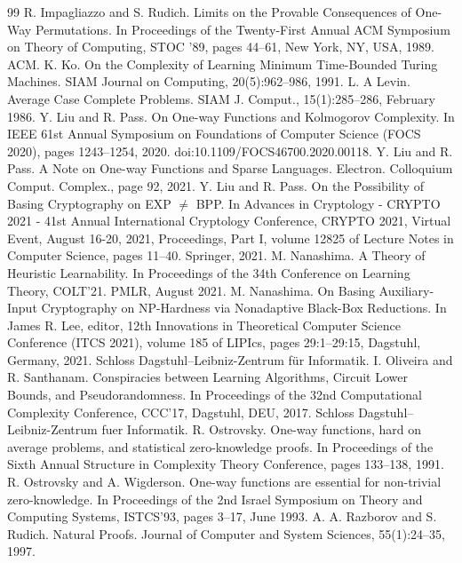 \begin{thebibliography}{99}
 R. Impagliazzo and S. Rudich. Limits on the Provable Consequences of One-Way Permutations. In Proceedings of the Twenty-First Annual ACM Symposium on Theory of Computing, STOC ’89, pages 44–61, New York, NY, USA, 1989. ACM.
 K. Ko. On the Complexity of Learning Minimum Time-Bounded Turing Machines. SIAM Journal on Computing, 20(5):962–986, 1991.
 L. A Levin. Average Case Complete Problems. SIAM J. Comput., 15(1):285–286, February 1986.
 Y. Liu and R. Pass. On One-way Functions and Kolmogorov Complexity. In IEEE 61st Annual Symposium on Foundations of Computer Science (FOCS 2020), pages 1243–1254, 2020. doi:10.1109/FOCS46700.2020.00118.
 Y. Liu and R. Pass. A Note on One-way Functions and Sparse Languages. Electron. Colloquium Comput. Complex., page 92, 2021.
 Y. Liu and R. Pass. On the Possibility of Basing Cryptography on EXP $\neq$ BPP. In Advances in Cryptology - CRYPTO 2021 - 41st Annual International Cryptology Conference, CRYPTO 2021, Virtual Event, August 16-20, 2021, Proceedings, Part I, volume 12825 of Lecture Notes in Computer Science, pages 11–40. Springer, 2021.
 M. Nanashima. A Theory of Heuristic Learnability. In Proceedings of the 34th Conference on Learning Theory, COLT’21. PMLR, August 2021.
 M. Nanashima. On Basing Auxiliary-Input Cryptography on NP-Hardness via Nonadaptive Black-Box Reductions. In James R. Lee, editor, 12th Innovations in Theoretical Computer Science Conference (ITCS 2021), volume 185 of LIPIcs, pages 29:1–29:15, Dagstuhl, Germany, 2021. Schloss Dagstuhl–Leibniz-Zentrum für Informatik.
 I. Oliveira and R. Santhanam. Conspiracies between Learning Algorithms, Circuit Lower Bounds, and Pseudorandomness. In Proceedings of the 32nd Computational Complexity Conference, CCC’17, Dagstuhl, DEU, 2017. Schloss Dagstuhl–Leibniz-Zentrum fuer Informatik.
 R. Ostrovsky. One-way functions, hard on average problems, and statistical zero-knowledge proofs. In Proceedings of the Sixth Annual Structure in Complexity Theory Conference, pages 133–138, 1991.
 R. Ostrovsky and A. Wigderson. One-way functions are essential for non-trivial zero-knowledge. In Proceedings of the 2nd Israel Symposium on Theory and Computing Systems, ISTCS’93, pages 3–17, June 1993.
 A. A. Razborov and S. Rudich. Natural Proofs. Journal of Computer and System Sciences, 55(1):24–35, 1997.

\end{thebibliography}
